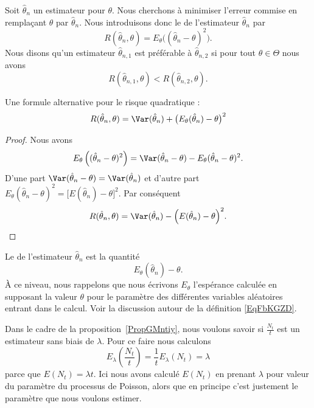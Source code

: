 Soit \( \hat\theta_n\) un estimateur pour \( \theta\). Nous cherchons à minimiser l'erreur commise en remplaçant \( \theta\) par \( \hat\theta_n\). Nous introduisons donc le  de l'estimateur \( \hat\theta_n\) par
\begin{equation}
	R(\hat\theta_n,\theta)=E_{\theta}\big( (\hat\theta_n-\theta)^2 \big).
\end{equation}
Nous disons qu'un estimateur \( \hat\theta_{n,1}\) est préférable à \( \hat\theta_{n,2}\) si pour tout \( \theta\in\Theta\) nous avons
\begin{equation}
	R(\hat\theta_{n,1},\theta)<R(\hat\theta_{n,2},\theta).
\end{equation}

\begin{lemma}
	Une formule alternative pour le risque quadratique :
	\begin{equation}
		R(\hat\theta_n,\theta)=\Var(\hat\theta_n)+\big( E_{\theta}(\hat\theta_n)-\theta \big)^2
	\end{equation}
\end{lemma}

\begin{proof}
	Nous avons
	\begin{equation}
		E_{\theta}\left( (\hat\theta_n-\theta)^2 \right)=\Var(\hat\theta_n-\theta)-E_{\theta}(\hat\theta_n-\theta)^2.
	\end{equation}
	D'une part \( \Var(\hat\theta_n-\theta)=\Var(\hat\theta_n)\) et d'autre part \( E_{\theta}(\hat\theta_n-\theta)^2=\big[ E(\hat\theta_n)-\theta \big]^2\). Par conséquent
	\begin{equation}    \label{EqRisqueetbaisiVar}
		R(\hat\theta_n,\theta)=\Var(\hat\theta_n)-\Big( E(\hat\theta_n)-\theta \Big)^2.
	\end{equation}
\end{proof}

Le  de l'estimateur \( \hat\theta_n\) est la quantité
\begin{equation}
	E_{\theta}(\hat\theta_n)-\theta.
\end{equation}
À ce niveau, nous rappelons que nous écrivons \( E_{\theta}\) l'espérance calculée en supposant la valeur \( \theta\) pour le paramètre des différentes variables aléatoires entrant dans le calcul. Voir la discussion autour de la définition \eqref{EqFbKGZD}.

\begin{example}     \label{ExytNlTq}
	Dans le cadre de la proposition~\ref{PropGMntiy}, nous voulons savoir si \( \frac{ N_t }{ t }\) est un estimateur sans biais de \( \lambda\). Pour ce faire nous calculons
	\begin{equation}
		E_{\lambda}\left( \frac{ N_t }{ t } \right)=\frac{1}{ t }E_{\lambda}(N_t)=\lambda
	\end{equation}
	parce que \( E(N_t)=\lambda t\). Ici nous avons calculé \( E(N_t)\) en prenant \( \lambda\) pour valeur du paramètre du processus de Poisson, alors que en principe c'est justement le paramètre que nous voulons estimer.
\end{example}

